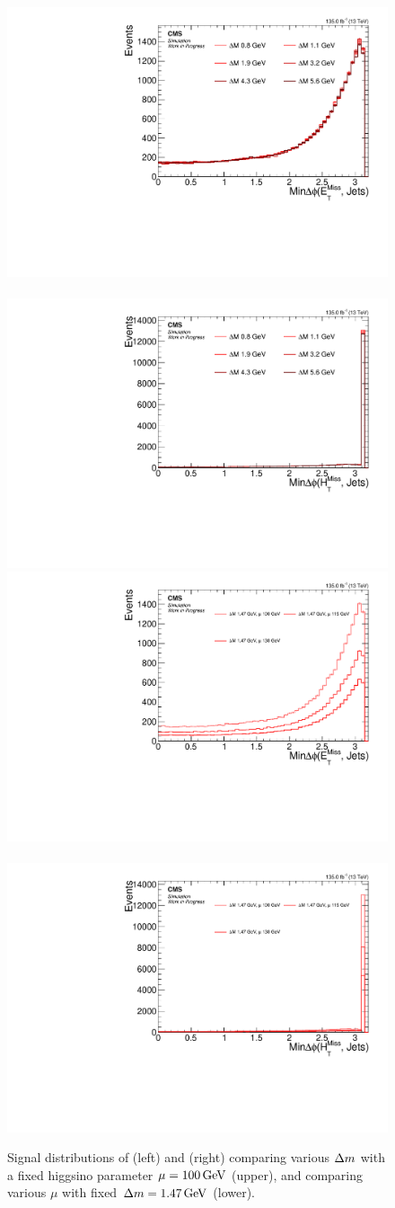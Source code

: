 \begin{figure}[!htb]
\centering
\includegraphics[width=0.48\linewidth]{plots/signal_common_distributions_fixed_mu/none_MinDeltaPhiMetJets.pdf} \,
\includegraphics[width=0.48\linewidth]{plots/signal_common_distributions_fixed_mu/none_MinDeltaPhiMhtJets.pdf}  \\
\includegraphics[width=0.48\linewidth]{plots/signal_common_distributions_fixed_dm/none_MinDeltaPhiMetJets.pdf} \,
\includegraphics[width=0.48\linewidth]{plots/signal_common_distributions_fixed_dm/none_MinDeltaPhiMhtJets.pdf}  \\
\caption[Signal $\mindphimetjets$ and $\mindphimhtjets$ distributions]{ Signal distributions of \mindphimetjets (left) and \mindphimhtjets (right) comparing various $\Delta m$ with a fixed higgsino parameter $\mu=100\,\text{Ge\hspace{-.08em}V}$ (upper), and comparing various $\mu$ with fixed $\Delta m=1.47\,\text{Ge\hspace{-.08em}V}$ (lower).}
\label{fig:signal-min-deltaphi-met-mht}
\end{figure}

